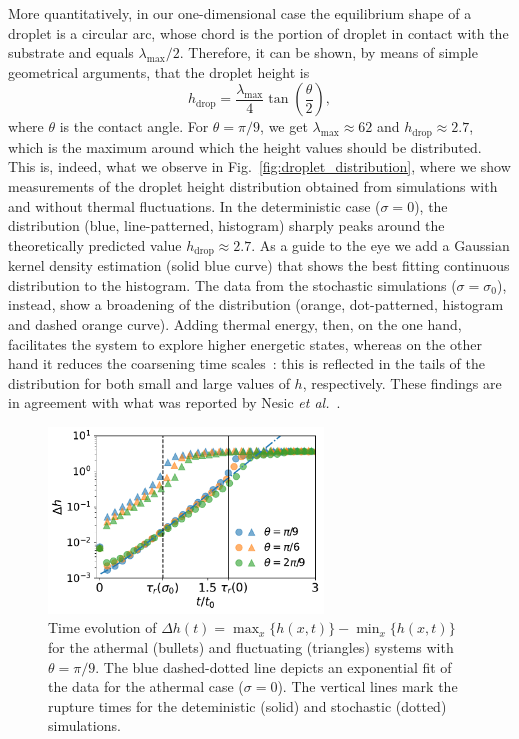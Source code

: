 More quantitatively, in our one-dimensional case the equilibrium shape of a droplet is a circular arc, whose chord is the portion of droplet in contact with the substrate and equals $\lambda_{\text{max}}/2$. 
Therefore, it can be shown, by means of simple geometrical arguments, that the droplet height is
\begin{equation}\label{eq:cap_height}
   h_{\text{drop}} = \frac{\lambda_{\text{max}}}{4}\tan\left(\frac{\theta}{2}\right), 
\end{equation}
where $\theta$ is the contact angle. 
For $\theta = \pi/9$, we get $\lambda_{\text{max}} \approx 62$ and $h_{\text{drop}} \approx 2.7$, which is the maximum around which the height values should be distributed.
This is, indeed, what we observe in Fig.~\ref{fig:droplet_distribution}, where we show measurements of the droplet height distribution obtained from simulations with and without thermal fluctuations.
In the deterministic case ($\sigma=0$), the distribution (blue, line-patterned, histogram) sharply peaks around the theoretically predicted value $h_{\text{drop}} \approx 2.7$. 
As a guide to the eye we add a Gaussian kernel density estimation (solid blue curve) that shows the best fitting continuous distribution to the histogram. 
The data from the stochastic simulations ($\sigma = \sigma_0$), instead, show a broadening of the distribution (orange, dot-patterned, histogram and dashed orange curve).
Adding thermal energy, then, on the one hand, facilitates the system to explore higher energetic states, whereas on the other hand it reduces the coarsening time scales~\cite{grunThinFilmFlowInfluenced2006}: this is reflected in the tails of the distribution for both small and large values of $h$, respectively.
These findings are in agreement with what was reported by Nesic \textit{et al.}~\cite{nesicFullyNonlinearDynamics2015}.
\begin{figure}
    \centering
    \includegraphics[width = 0.65\textwidth]{graphics/Correct_t0_normed_delta_h_evo_seminar.pdf}
    \caption{Time evolution of $\Delta h(t) = \max_x\{h(x,t)\} - \min_x\{h(x,t)\}$ for the athermal (bullets) and fluctuating (triangles) systems with $\theta=\pi/9$.
    The blue dashed-dotted line depicts an exponential fit of the data for the athermal case ($\sigma=0$).
    The vertical lines mark the rupture times for the deteministic (solid) and stochastic (dotted) simulations.}
    \label{fig:delta_heigth_evo}
\end{figure}

